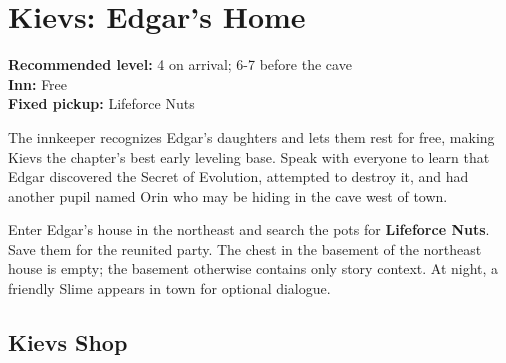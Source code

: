 \documentclass[
  american,
  10pt,
  letterpaper,
  oneside,
  open=any]{scrreprt}
\begin{document}
\section{Kievs: Edgar's Home}\label{kievs-edgars-home}

\textbf{Recommended level:} 4 on arrival; 6-7 before the cave\\
\textbf{Inn:} Free\\
\textbf{Fixed pickup:} Lifeforce Nuts

The innkeeper recognizes Edgar's daughters and lets them rest for free,
making Kievs the chapter's best early leveling base. Speak with everyone
to learn that Edgar discovered the Secret of Evolution, attempted to
destroy it, and had another pupil named Orin who may be hiding in the
cave west of town.

Enter Edgar's house in the northeast and search the pots for
\textbf{Lifeforce Nuts}. Save them for the reunited party. The chest in
the basement of the northeast house is empty; the basement otherwise
contains only story context. At night, a friendly Slime appears in town
for optional dialogue.

\subsection{Kievs Shop}\label{kievs-shop}
\end{document}

